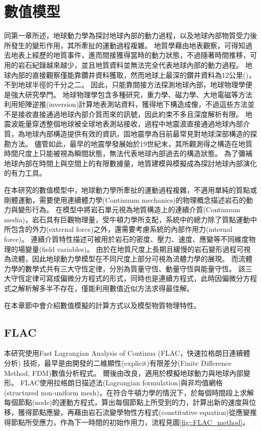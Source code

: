 
\chapter{數值模型}

同第一章所述，地球動力學為探討地球內部的動力過程，以及地球內部物質受力後所發生的變形作用，其所牽扯的運動過程複雜。
地質學藉由地表觀察，可得知過去地表上經歷的地質事件，進而間接獲得當時的動力狀態，不過隨著時間推移，可用的岩石紀錄越來越少，並且地質資料並無法完全代表地球內部的動力過程。
地球內部的直接觀察僅能靠鑽井資料獲取，然而地球上最深的鑽井資料為12公里(\citealp{ganchin1998seismic})，不到地球半徑的千分之二。
因此，只能靠間接方法探測地球內部，地球物理學便是強大研究學門。
地球物理學包含多種研究，重力學、磁力學、大地電磁等方法利用矩陣逆推(inversion)計算地表測站資料，獲得地下構造成像，不過這些方法並不是接收直接通過地球內部介質而來的訊號，因此約束不多且深度解析有限。
地震波能量穿透整個地球被全球地表測站接收，過程中地震波直接通過地球內部介質，為地球內部構造提供有效的資訊，固地震學為目前最常見對地球深部構造的探勘方法。
儘管如此，最早的地震學發展始於19世紀末，其所觀測得之構造在地質時間尺度上只能被視為瞬間狀態，無法代表地球內部過去的構造狀態。
為了彌補地球內部在時間上與空間上的有限數據量，地質建模與模擬成為探討地球內部演化的有力工具。

在本研究的數值模型中，地球動力學所牽扯的運動過程複雜，不適用單純的質點或剛體運動，需要使用連續體力學(Continuum mechanics)的物理概念描述岩石的動力與變形行為。
在模型中將岩石單元視為地質構造上的連續介質(Continuum media)，岩石具有巨觀物理量，受牛頓力學所支配，系統中的總力除了質點運動中所包含的外力(external force)之外，還需要考慮系統的內部作用力(internal force)。
連續介質特性描述可被用於岩石的密度、壓力、速度、應變等不同維度物理的場變量(field variables)。
由於在地質尺度上長期且緩慢的岩石變形過程可視為流體，因此地球動力學模型在不同尺度上部分可視為流體力學的展現。
而流體力學的數學式共有三大守恆定律，分別為質量守恆、動量守恆與能量守恆。
該三大守恆定律可寫成偏微分方程式的形式，同時也是連續方程式，此時因偏微分方程式之解析解多半不存在，僅能利用數值近似方法求得最佳解。

在本章節中會介紹數值模擬的計算方式以及模型物質物理特性。

\section{FLAC}

本研究使用Fast Lagrangian Analysis of Continua (FLAC，快速拉格朗日連續體分析) 技術，最早是由\citealp{cundall1989numerical}開發的二維顯性(explicit)有限差分(Finite Difference Method, FDM)數值分析程式。
爾後由\citealp{Lavier2000}改良，適用於模擬地球動力與地球內部變形。
FLAC使用拉格朗日描述法(Lagrangian formulation)與非均值網格(structured non-uniform mesh)，在符合牛頓力學的情況下，於每個時間段上求解每個節點(node)的運動方程式，算出每個節點上所受到的力，計算出新的速度與位移，獲得節點應變，再藉由岩石流變學物性方程式(constitutive equation)從應變推得節點所受應力，作為下一時間的初始作用力，流程見圖\ref{fig::FLAC_method}。

